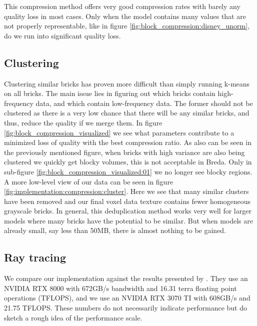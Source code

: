This compression method offers very good compression rates with barely any quality loss in most cases. Only when the model contains many values that are not properly representable, like in figure \ref{fig:block_compression:disney_unorm}, do we run into significant quality loss.

\subsection{Clustering} \label{results:clustering}
Clustering similar bricks has proven more difficult than simply running k-means on all bricks. The main issue lies in figuring out which bricks contain high-frequency data, and which contain low-frequency data. The former should not be clustered as there is a very low chance that there will be any similar bricks, and thus, reduce the quality if we merge them. In figure \ref{fig:block_compression_visualized} we see what parameters contribute to a minimized loss of quality with the best compression ratio. As also can be seen in the previously mentioned figure, when bricks with high variance are also being clustered we quickly get blocky volumes, this is not acceptable in Breda. Only in sub-figure \ref{fig:block_compression_visualized:01} we no longer see blocky regions. A more low-level view of our data can be seen in figure \ref{fig:implementation:compression:cluster}. Here we see that many similar clusters have been removed and our final voxel data texture contains fewer homogeneous grayscale bricks.  In general, this deduplication method works very well for larger models where many bricks have the potential to be similar. But when models are already small, say less than 50MB, there is almost nothing to be gained. 

\subsection{Ray tracing} \label{results:ray_tracing}
We compare our implementation against the results presented by \cite{NanoVDBBenchmark}. They use an NVIDIA RTX 8000 with 672GB/s bandwidth and 16.31 terra floating point operations (TFLOPS), and we use an NVIDIA RTX 3070 TI with 608GB/s and 21.75 TFLOPS. These numbers do not necessarily indicate performance but do sketch a rough idea of the performance scale. 

